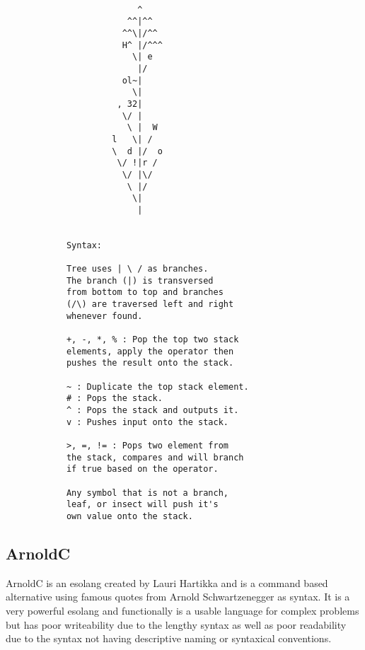\documentclass{article}
\begin{document}
    \begin{multicols*}{2}
        \begin{verbatim}

                          ^
                        ^^|^^
                       ^^\|/^^
                       H^ |/^^^
                         \| e
                          |/
                       ol~|
                         \|
                      , 32|
                       \/ |
                        \ |  W
                     l   \| /
                     \  d |/  o
                      \/ !|r /  
                       \/ |\/
                        \ |/
                         \|
                          |


            Syntax:

            Tree uses | \ / as branches.
            The branch (|) is transversed
            from bottom to top and branches 
            (/\) are traversed left and right
            whenever found.

            +, -, *, % : Pop the top two stack
            elements, apply the operator then
            pushes the result onto the stack.

            ~ : Duplicate the top stack element.
            # : Pops the stack.
            ^ : Pops the stack and outputs it.
            v : Pushes input onto the stack.

            >, =, != : Pops two element from
            the stack, compares and will branch
            if true based on the operator.

            Any symbol that is not a branch,
            leaf, or insect will push it's
            own value onto the stack.
        \end{verbatim}


    \end{multicols*}


\subsection*{ArnoldC}
ArnoldC is an esolang created by Lauri Hartikka and is a command based alternative using famous quotes from Arnold Schwartzenegger as syntax.
It is a very powerful esolang and functionally is a usable language for complex problems but has poor writeability due to the lengthy syntax
as well as poor readability due to the syntax not having descriptive naming or syntaxical conventions.\cite{ArnoldC} \\
\end{document}
